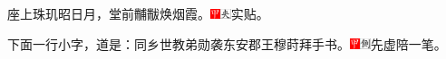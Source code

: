 座上珠玑昭日月，堂前黼黻焕烟霞。{\includegraphics[width=3mm]{../Images/00002}\includegraphics[width=3mm]{../Images/00012}\footnotesize \kaishu 实贴。}

下面一行小字，道是：同乡世教弟勋袭东安郡王穆莳拜手书。{\includegraphics[width=3mm]{../Images/00002}\includegraphics[width=3mm]{../Images/00011}\footnotesize \kaishu 先虚陪一笔。}


